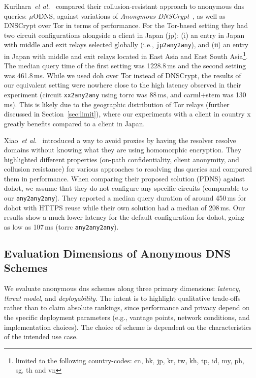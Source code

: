 Kurihara~\emph{et al.}~\cite{kurihara2023muodns} compared their
collusion-resistant approach to anonymous \ac{dns} queries: $\mu$ODNS, against
variations of \emph{Anonymous DNSCrypt}~\cite{adnscrypt}, as well as DNSCrypt
over Tor in terms of performance. For the Tor-based setting they had two
circuit configurations alongside a client in Japan (jp): (i) an entry in Japan
with middle and exit relays selected globally (i.e., \texttt{jp2any2any}), and
(ii) an entry in Japan with middle and exit relays located in East Asia and
East South Asia\footnote{limited to the following country-codes: cn, hk, jp,
kr, tw, kh, tp, id, my, ph, sg, th and vn}. The median query time of the first
setting was 1228.8\,ms and the second setting was 461.8\,ms. While we used
\ac{doh} over Tor instead of DNSCrypt, the results of our equivalent setting
were nowhere close to the high latency observed in their experiment (circuit
\texttt{xx2any2any} using torrc was 88\,ms, and carml+stem was 130\,ms). This
is likely due to the geographic distribution of Tor relays (further discussed
in Section~\ref{sec:limit}), where our experiments with a client in country x
greatly benefits compared to a client in Japan.

Xiao~\emph{et al.}~\cite{xiao2025} introduced a way to avoid proxies by having
the resolver resolve domains without knowing what they are using homomorphic
encryption. They highlighted different properties (on-path confidentiality,
client anonymity, and collusion resistance) for various approaches to resolving
\ac{dns} queries and compared them in performance. When comparing their
proposed solution (PDNS) against \ac{dohot}, we assume that they do not
configure any specific circuits (comparable to our \texttt{any2any2any}). They
reported a median query duration of around 450\,ms for \ac{dohot} with HTTPS
reuse while their own solution had a median of 208\,ms. Our results show a much
lower latency for the default configuration for \ac{dohot}, going as low as 
107\,ms (torrc \texttt{any2any2any}).

\subsection{Evaluation Dimensions of Anonymous DNS Schemes} \label{sec:eval}
We evaluate anonymous \ac{dns} schemes along three primary dimensions:
\emph{latency}, \emph{threat model}, and \emph{deployability}. The intent is to
highlight qualitative trade-offs rather than to claim absolute rankings, since
performance and privacy depend on the specific deployment parameters (e.g.,
vantage points, network conditions, and implementation choices). The choice of
scheme is dependent on the characteristics of the intended use case.


